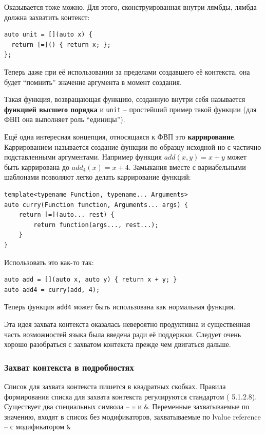 \documentclass[a4paper,12pt,oneside]{article}
\begin{document}
Оказывается тоже можно. Для этого, сконструированная внутри лямбды, лямбда должна захватить контекст:

\begin{lstlisting}
auto unit = [](auto x) {
  return [=]() { return x; };
};
\end{lstlisting}

Теперь даже при её использовании за пределами создавшего её контекста, она будет ``помнить'' значение аргумента в момент создания.

Такая функция, возвращающая функцию, созданную внутри себя называется \textbf{функцией высшего порядка} и \lstinline!unit! -- простейший пример такой функции (для ФВП она выполняет роль ``единицы'').

Ещё одна интересная концепция, относящаяся к ФВП это \textbf{каррирование}. Каррированием называется создание функции по образцу исходной но с частично подставленными аргументами. Например функция $add(x,y) = x + y$ может быть каррирована до $add_4(x) = x + 4$. Замыкания вместе с вариабельными шаблонами позволяют легко делать каррирование функций:

\begin{lstlisting}
template<typename Function, typename... Arguments>
auto curry(Function function, Arguments... args) {
    return [=](auto... rest) {
        return function(args..., rest...);
    }
}
\end{lstlisting}

Использовать это как-то так:

\begin{lstlisting}
auto add = [](auto x, auto y) { return x + y; }
auto add4 = curry(add, 4);
\end{lstlisting}

Теперь функция \lstinline!add4! может быть использована как нормальная функция.

Эта идея захвата контекста оказалась невероятно продуктивна и существенная часть возможностей языка была введена ради её поддержки. Следует очень хорошо разобраться с захватом контекста прежде чем двигаться дальше.

\subsubsection{Захват контекста в подробностях}\label{ContextCapture}

Список для захвата контекста пишется в квадратных скобках. Правила формирования списка для захвата контекста регулируются стандартом (\cite{stdcpp14} 5.1.2.8). Существует два специальных символа -- \lstinline!=! и \lstinline!&!. Переменные захватываемые по значению, входят в список без модификаторов, захватываемые по lvalue reference -- с модификатором \lstinline!&!
\end{document}
